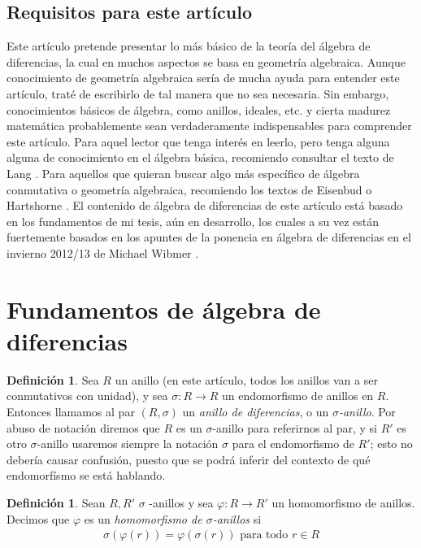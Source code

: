 \documentclass[letterpaper]{article}
\def\fa{\text{ para todo }}
\theoremstyle{definition}
\newtheorem{defn}[Satz]{Definici\'on}
\begin{document}
\subsection{Requisitos para este art\'iculo}

Este art\'iculo pretende presentar lo m\'as b\'asico de la teor\'ia del \'algebra de diferencias, la cual en muchos aspectos se basa en geometr\'ia algebraica. Aunque conocimiento de geometr\'ia algebraica ser\'ia de mucha ayuda para entender este art\'iculo, trat\'e de escribirlo
de tal manera que no sea necesaria. Sin embargo, conocimientos b\'asicos de \'algebra, como anillos, ideales, etc. y cierta madurez matem\'atica probablemente sean verdaderamente indispensables para comprender este art\'iculo. 
Para aquel lector que tenga inter\'es en leerlo, pero tenga alguna alguna de conocimiento en el \'algebra b\'asica, recomiendo consultar el texto de Lang \cite{lang}. Para aquellos que quieran buscar algo m\'as espec\'ifico de \'algebra conmutativa o geometr\'ia algebraica, recomiendo los textos de Eisenbud \cite{eisenbud} o Hartshorne \cite{hartshorne}. El contenido de \'algebra de diferencias de este art\'iculo est\'a basado en los fundamentos de mi tesis, a\'un en desarrollo, 
los cuales a su vez est\'an fuertemente basados en los apuntes de la ponencia en \'algebra de diferencias en el invierno 2012/13 de Michael Wibmer \cite{wibmer}.

\section{Fundamentos de \'algebra de diferencias}
\begin{defn}
Sea $R$ un anillo (en este art\'iculo, todos los anillos van a ser conmutativos con unidad), y  sea $
\sigma: R \rightarrow R$ un endomorfismo de anillos en $R$. Entonces llamamos al par $(R,\sigma)$ un \emph{anillo de diferencias}, o un $\sigma$\emph{-anillo}. Por abuso de notaci\'on diremos que $R$ es un $\sigma$-anillo  para referirnos al par, y si $R'$ es otro $\sigma$-anillo  usaremos siempre la notaci\'on $\sigma$ para el endomorfismo de $R'$; esto no deber\'ia causar confusi\'on, puesto que se podr\'a inferir del contexto de 
qu\'e endomorf\'ismo se est\'a hablando.
\end{defn}

\begin{defn}
Sean $R, R'$  $\sigma$ -anillos y sea $\varphi: R \rightarrow R'$ un homomorfismo de anillos. Decimos que $\varphi$ es un \emph{homomorfismo de $\sigma$-anillos}  si 
\begin{align*}
\sigma(\varphi(r)) = \varphi(\sigma(r)) \fa r \in R
\end{align*}
\end{defn}
\end{document}
